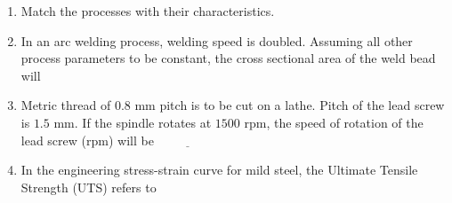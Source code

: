 \documentclass[journal]{IEEEtran}
\begin{document}
\begin{enumerate}[leftmargin=0pt]
    \item Match the processes with their characteristics.
\begin{table}[h]
    \centering
    
\end{table}
    \begin{enumerate}
    \end{enumerate}

    \item In an arc welding process, welding speed is doubled. Assuming all other process parameters to be constant, the cross sectional area of the weld bead will
    \begin{enumerate}
    \end{enumerate}

    \item Metric thread of $0.8$ mm pitch is to be cut on a lathe. Pitch of the lead screw is $1.5$ mm. If the spindle rotates at $1500$ rpm, the speed of rotation of the lead screw (rpm) will be $\underline{\hspace{2cm}}$

    \item In the engineering stress-strain curve for mild steel, the Ultimate Tensile Strength (UTS) refers to
    \begin{enumerate}
    \end{enumerate}


\end{enumerate}
\end{document}
